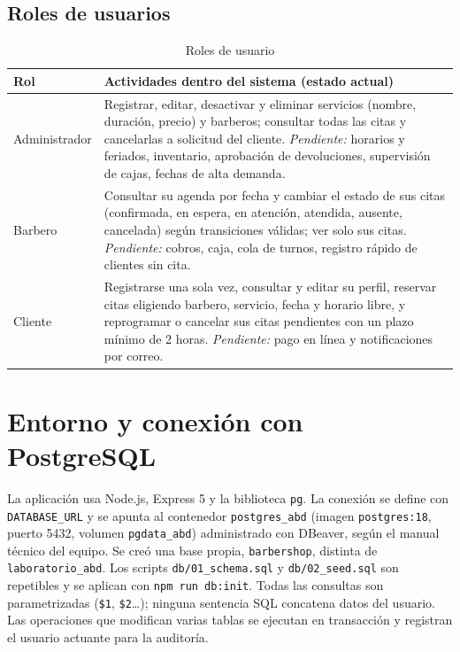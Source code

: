 \documentclass[12pt,a4paper,oneside]{article}
\begin{document}
\subsection{Roles de usuarios}
\begin{table}[H]\centering\small
\begin{tabularx}{\textwidth}{>{\raggedright\arraybackslash}p{2.6cm}Y}\toprule
\textbf{Rol} & \textbf{Actividades dentro del sistema (estado actual)}\\\midrule
Administrador & Registrar, editar, desactivar y eliminar servicios (nombre, duraci\'on, precio) y barberos; consultar todas las citas y cancelarlas a solicitud del cliente. \emph{Pendiente:} horarios y feriados, inventario, aprobaci\'on de devoluciones, supervisi\'on de cajas, fechas de alta demanda.\\
Barbero & Consultar su agenda por fecha y cambiar el estado de sus citas (confirmada, en espera, en atenci\'on, atendida, ausente, cancelada) seg\'un transiciones v\'alidas; ver solo sus citas. \emph{Pendiente:} cobros, caja, cola de turnos, registro r\'apido de clientes sin cita.\\
Cliente & Registrarse una sola vez, consultar y editar su perfil, reservar citas eligiendo barbero, servicio, fecha y horario libre, y reprogramar o cancelar sus citas pendientes con un plazo m\'inimo de 2 horas. \emph{Pendiente:} pago en l\'inea y notificaciones por correo.\\\bottomrule
\end{tabularx}
\caption{Roles de usuario}\end{table}

\section{Entorno y conexi\'on con PostgreSQL}
La aplicaci\'on usa Node.js, Express 5 y la biblioteca \texttt{pg}. La conexi\'on se define con \texttt{DATABASE\_URL} y se apunta al contenedor \texttt{postgres\_abd} (imagen \texttt{postgres:18}, puerto 5432, volumen \texttt{pgdata\_abd}) administrado con DBeaver, seg\'un el manual t\'ecnico del equipo. Se cre\'o una base propia, \texttt{barbershop}, distinta de \texttt{laboratorio\_abd}. Los scripts \texttt{db/01\_schema.sql} y \texttt{db/02\_seed.sql} son repetibles y se aplican con \texttt{npm run db:init}. Todas las consultas son parametrizadas (\texttt{\$1}, \texttt{\$2}\ldots); ninguna sentencia SQL concatena datos del usuario. Las operaciones que modifican varias tablas se ejecutan en transacci\'on y registran el usuario actuante para la auditor\'ia.
\end{document}
